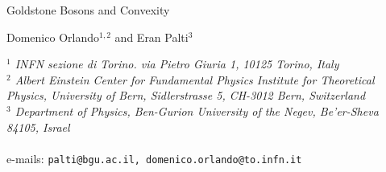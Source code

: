 \documentclass[11pt]{article}
\numberwithin{equation}{section}
\begin{document}
	
	
	
	
	
	\begin{center}        %
		\Huge Goldstone Bosons and Convexity
	\end{center}
	
	\vspace{0.7cm}
	\begin{center}        %
		{\large  Domenico Orlando$^{1,2}$ and Eran Palti$^3$}
	\end{center}
	
	\vspace{0.15cm}
	\begin{center}   
	\emph{${}^1$ INFN sezione di Torino.
via Pietro Giuria 1, 10125 Torino, Italy}\\[.3cm]     %
	\emph{${}^2$ Albert Einstein Center for Fundamental Physics
Institute for Theoretical Physics, University of Bern,
Sidlerstrasse 5, CH-3012 Bern, Switzerland}\\[.3cm]     %
		\emph{${}^3$ Department of Physics, Ben-Gurion University of the Negev, Be'er-Sheva 84105, Israel}\\[.3cm]
		\emph{}\\[.2cm]
		
		e-mails: \tt palti@bgu.ac.il, \;domenico.orlando@to.infn.it
	\end{center}
	
	\vspace{1cm}
	
	
	\begin{abstract}
	\noindent
	We study the spectrum of scalar charged operators in Conformal Field Theories (\textsc{cft}s) with a $U(1)$ global symmetry. The charged operators are dual, by the state-operator correspondence, to homogenous charged states on the sphere. Such states can break the $U(1)$ symmetry, and we define what we call the large $f$ regime in the \textsc{cft} as one where the  symmetry breaking scale is much higher than the scale of the \textsc{cft} sphere. In such a regime, there is (an approximate) Goldstone boson associated to the breaking. We show that consistency of the Goldstone boson physics implies that the spectrum of states, and therefore of operators, must be convex in charge. More precisely, we show that any family of operators of different charges, which are lowest dimension of their charge, and which additionally share the same realisation of the Goldstone boson in terms of the degrees of freedom of the \textsc{cft}, must be convex. 
	\end{abstract}
	
\end{document}
